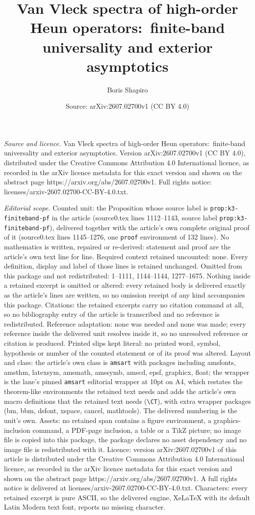 \documentclass[10pt,a4paper]{amsart}
\title[Van Vleck spectra of high-order Heun operators:\ finite-band]{Van Vleck spectra of high-order Heun operators:\ finite-band universality and exterior asymptotics}
\author{Boris Shapiro}
\date{Source: arXiv:2607.02700v1 (CC BY 4.0)}
\begin{document}
\maketitle

\noindent\emph{Source and licence.} Van Vleck spectra of high-order Heun operators:\ finite-band universality and exterior asymptotics. Version arXiv:2607.02700v1 (CC BY 4.0), distributed under the Creative Commons Attribution 4.0 International licence, as recorded in the arXiv licence metadata for this exact version and shown on the abstract page https://arxiv.org/abs/2607.02700v1. Full rights notice: licenses/arxiv-2607.02700-CC-BY-4.0.txt.\par\smallskip

\noindent\textit{Editorial scope.} Counted unit: the Proposition whose source label is \texttt{prop:k3-finiteband-pf} in the article (source0.tex lines 1112--1143, source label \texttt{prop:k3-finiteband-pf}), delivered together with the article's own complete original proof of it (source0.tex lines 1145--1276, one \texttt{proof} environment of 132 lines). No mathematics is written, repaired or re-derived: statement and proof are the article's own text line for line. Required context retained uncounted: none. Every definition, display and label of those lines is retained unchanged. Omitted from this package and not redistributed: 1--1111, 1144--1144, 1277--1675. Nothing inside a retained excerpt is omitted or altered: every retained body is delivered exactly as the article's lines are written, so no omission receipt of any kind accompanies this package. Citations: the retained excerpts carry no citation command at all, so no bibliography entry of the article is transcribed and no reference is redistributed. Reference adaptation: none was needed and none was made; every reference inside the delivered unit resolves inside it, so no unresolved reference or citation is produced. Printed slips kept literal: no printed word, symbol, hypothesis or number of the counted statement or of its proof was altered. Layout and class: the article's own class is \texttt{amsart} with packages including amsfonts, amsthm, latexsym, amsmath, amssymb, amscd, epsf, graphicx, float; the wrapper is the lane's pinned \texttt{amsart} editorial wrapper at 10pt on A4, which restates the theorem-like environments the retained text needs and adds the article's own macro definitions that the retained text needs (\texttt{\textbackslash CT}), with extra wrapper packages (bm, bbm, dsfont, xspace, cancel, mathtools). The delivered numbering is the unit's own. Assets: no retained span contains a figure environment, a graphics-inclusion command, a PDF-page inclusion, a table or a TikZ picture; no image file is copied into this package, the package declares no asset dependency and no image file is redistributed with it. Licence: version arXiv:2607.02700v1 of this article is distributed under the Creative Commons Attribution 4.0 International licence, as recorded in the arXiv licence metadata for this exact version and shown on the abstract page https://arxiv.org/abs/2607.02700v1. A full rights notice is delivered at licenses/arxiv-2607.02700-CC-BY-4.0.txt. Characters: every retained excerpt is pure ASCII, so the delivered engine, XeLaTeX with its default Latin Modern text font, reports no missing character.
\end{document}
